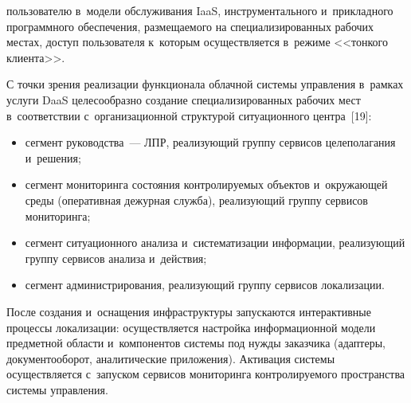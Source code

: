\begin{multicols}{2}

  \noindent
   пользователю в~модели обслуживания IaaS, 
инструментального и~прикладного программного обес\-пе\-че\-ния, раз\-ме\-ща\-емо\-го 
на специализированных рабочих местах, доступ пользователя к~которым 
осущест\-вляется в~режиме <<тонкого клиента>>.  

    С точки зрения реализации функционала облачной сис\-те\-мы управ\-ле\-ния 
    в~рамках услуги DaaS целесообразно создание специализированных рабочих 
мест в~соответствии с~организационной структурой ситуационного 
центра~[19]:
    \begin{itemize}
\item сегмент руководства~--- ЛПР, реа\-ли\-зу\-ющий 
группу сервисов целеполагания и~решения; 
\item сегмент мониторинга состояния контролируемых объектов 
и~окружающей среды (оперативная дежурная служба), реа\-ли\-зу\-ющий группу 
сервисов мониторинга; 
\item сегмент ситуационного анализа и~систематизации информации, 
реа\-ли\-зу\-ющий группу сервисов анализа и~действия;
\item сегмент администрирования, реа\-ли\-зу\-ющий группу сервисов 
локализации.
\end{itemize}

    После создания и~оснащения инфраструктуры запускаются 
интерактивные процессы локализации: осуществляется настройка 
информационной модели предметной об\-ласти и~компонентов сис\-те\-мы под 
нужды заказчика (адаптеры, документооборот, аналитические приложения). 
Активация сис\-те\-мы осуществляется с~запуском сервисов мониторинга 
конт\-ро\-ли\-ру\-емо\-го пространства сис\-те\-мы управ\-ле\-ния.

    
{\small\frenchspacing
 {\baselineskip=10.8pt
 \begin{thebibliography}{99}


\end{thebibliography}}}
\end{multicols}
